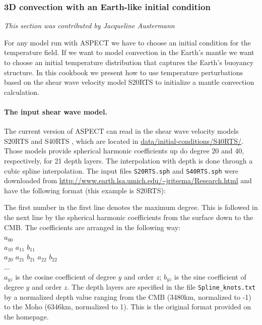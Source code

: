 \documentclass{article}
\newcommand{\aspect}{\textsc{ASPECT}}
\begin{document}
\subsubsection{3D convection with an Earth-like initial condition}
\label{sec:cookbooks-S20RTS}
\textit{This section was contributed by Jacqueline Austermann}

For any model run with \aspect{} we have to choose an initial condition for the
temperature field. If we want to model convection in the Earth's mantle we want
to choose an initial temperature distribution that captures the Earth's buoyancy
structure. In this cookbook we present how to use temperature perturbations
based on the shear wave velocity model S20RTS \cite{S20RTS} to
initialize a mantle convection calculation.

\paragraph{The input shear wave model.}

The current version of \aspect{} can read in the shear wave velocity models
S20RTS \cite{S20RTS} and S40RTS \cite{S40RTS}, which are located
in \url{data/initial-conditions/S40RTS/}. Those models provide
spherical harmonic coefficients up do degree 20 and 40, respectively, for 21
depth layers. The interpolation with depth is done through a cubic spline
interpolation. The input files \texttt{S20RTS.sph} and \texttt{S40RTS.sph} were
downloaded from \url{http://www.earth.lsa.umich.edu/~jritsema/Research.html}
and have the following format (this example is S20RTS):



The first number in the first line denotes the maximum degree. This is followed in
the next line by the spherical harmonic coefficients from the surface down to the
CMB. The coefficients are arranged in the following way:\\

\noindent $a_{00}$ \\
$a_{10}$ $a_{11}$ $b_{11}$ \\
$a_{20}$ $a_{21}$ $b_{21}$ $a_{22}$ $b_{22}$ \\
... \\

$a_{yz}$ is the cosine coefficient of degree $y$ and order $z$; $b_{yz}$ is
the sine coefficient of degree $y$ and order $z$. The depth layers are specified
in the file \texttt{Spline\_knots.txt} by a normalized depth value ranging from the CMB (3480km,
normalized to -1) to the Moho (6346km, normalized to 1). This is the original
format provided on the homepage.
\end{document}
